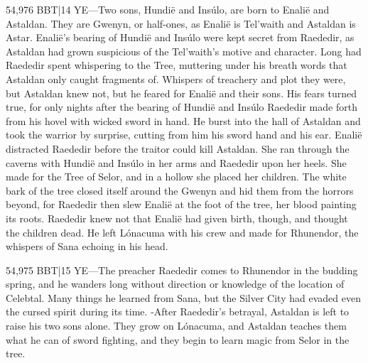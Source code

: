 \documentclass[smalldemyvopaper,11pt,twoside,onecolumn,openright,extrafontsizes]{memoir}
\begin{document}
{{54,976 BBT|14 YE—Two sons, Hundië and Insúlo, are born to Enalië and Astaldan. They are Gwenyn, or half-ones, as Enalië is Tel’waith and Astaldan is Astar. Enalië’s bearing of Hundië and Insúlo were kept secret from Raededir, as Astaldan had grown suspicious of the Tel’waith’s motive and character. Long had Raededir spent whispering to the Tree, muttering under his breath words that Astaldan only caught fragments of. Whispers of treachery and plot they were, but Astaldan knew not, but he feared for Enalië and their sons. His fears turned true, for only nights after the bearing of Hundië and Insúlo Raededir made forth from his hovel with wicked sword in hand. He burst into the hall of Astaldan and took the warrior by surprise, cutting from him his sword hand and his ear. Enalië distracted Raededir before the traitor could kill Astaldan. She ran through the caverns with Hundië and Insúlo in her arms and Raededir upon her heels. She made for the Tree of Selor, and in a hollow she placed her children. The white bark of the tree closed itself around the Gwenyn and hid them from the horrors beyond, for Raededir then slew Enalië at the foot of the tree, her blood painting its roots. Raededir knew not that Enalië had given birth, though, and thought the children dead. He left Lónacuma with his crew and made for Rhunendor, the whispers of Sana echoing in his head.

54,975 BBT|15 YE—The preacher Raededir comes to Rhunendor in the budding spring, and he wanders long without direction or knowledge of the location of Celebtal. Many things he learned from Sana, but the Silver City had evaded even the cursed spirit during its time.
-After Raededir’s betrayal, Astaldan is left to raise his two sons alone. They grow on Lónacuma, and Astaldan teaches them what he can of sword fighting, and they begin to learn magic from Selor in the tree.

}}
\end{document}
